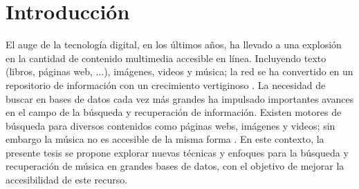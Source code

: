 \chapter{Introducción}
\label{chapter:introduction}
El auge de la tecnología digital, en los últimos años, ha llevado a una explosión en la cantidad de contenido multimedia accesible en línea. Incluyendo texto (libros, páginas web, ...), imágenes, videos y música; la red se ha convertido en un repositorio de información con un crecimiento vertiginoso \cite{owidinternet}. La necesidad de buscar en bases de datos cada vez más grandes ha impulsado importantes avances en el campo de la búsqueda y recuperación de información. Existen motores de búsqueda para diversos contenidos como páginas webs, imágenes y videos; sin embargo la música no es accesible de la misma forma \cite{Koepke2021AudioRW}. En este contexto, la presente tesis se propone explorar nuevas técnicas y enfoques para la búsqueda y recuperación de música en grandes bases de datos, con el objetivo de mejorar la accesibilidad de este recurso. \\
